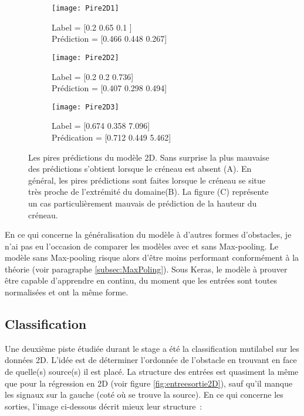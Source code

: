     \begin{figure}[H]
    \begin{subfigure}{.33\textwidth}
    \centering
    \texttt{[image: Pire2D1]}  
    \caption[Pire2D1]{Label = [0.2  0.65 0.1 ] \\ Prédiction = [0.466 0.448 0.267]}
    \end{subfigure}
    \begin{subfigure}{.33\textwidth}
    \centering
    \texttt{[image: Pire2D2]}  
    \caption[Pire2D2]{Label = [0.2   0.2   0.736]  \\ Prédiction = [0.407 0.298 0.494]}
    \end{subfigure}
    \begin{subfigure}{.33\textwidth}
    \centering
    \texttt{[image: Pire2D3]}  
    \caption[Pire2D3]{Label = [0.674 0.358 7.096]  \\ Prédication = [0.712 0.449 5.462]}
    \end{subfigure}

     \centering
    \decoRule
    \caption[Pire2D]{Les pires prédictions du modèle 2D. Sans surprise la plus mauvaise des prédictions s'obtient lorsque le créneau est absent (A). En général, les pires prédictions sont faites lorsque le créneau se situe très proche de l'extrémité du domaine(B). La figure (C) représente un cas particulièrement mauvais de prédiction de la hauteur du créneau.}
    \label{fig:Pire2D}
    \end{figure}
    
    En ce qui concerne la généralisation du modèle à d'autres formes d'obstacles, je n'ai pas eu l'occasion de comparer les modèles avec et sans Max-pooling. Le modèle sans Max-pooling risque alors d'être moins performant conformément à la théorie (voir paragraphe \ref{subsec:MaxPoling}). Sous Keras, le modèle à prouver être capable d'apprendre en continu, du moment que les entrées sont toutes normalisées et ont la même forme.

\subsection{Classification}
\label{sec:Classif}
Une deuxième piste étudiée durant le stage a été la classification mutilabel sur les données 2D. L'idée est de déterminer l'ordonnée de l'obstacle en trouvant en face de quelle(s) source(s) il est placé. La structure des entrées est quasiment la même que pour la régression en 2D (voir figure \ref{fig:entreesortie2D}), sauf qu'il manque les signaux sur la gauche (coté où se trouve la source). En ce qui concerne les sorties, l'image ci-dessous décrit mieux leur structure :

